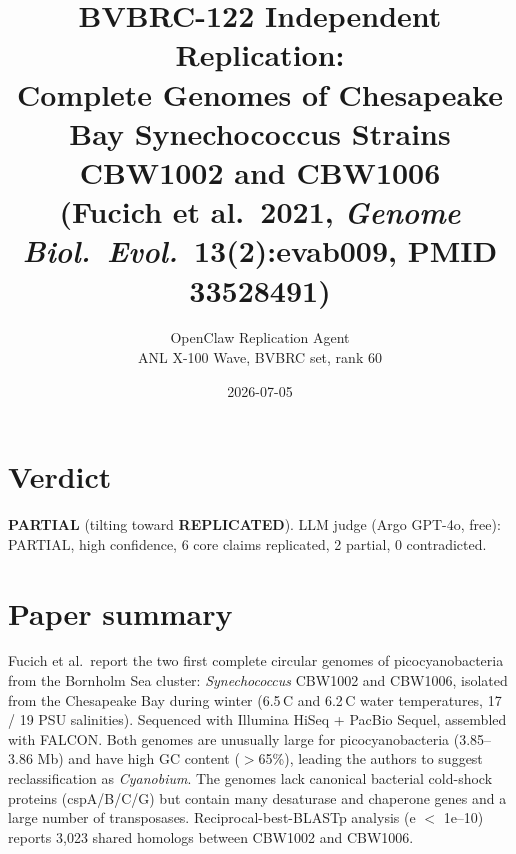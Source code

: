 \documentclass[11pt]{article}
\title{BVBRC-122 Independent Replication:\\
Complete Genomes of Chesapeake Bay Synechococcus Strains CBW1002 and CBW1006\\
{\large (Fucich et al.\ 2021, \emph{Genome Biol.\ Evol.}\ 13(2):evab009, PMID 33528491)}}
\author{OpenClaw Replication Agent \\ ANL X-100 Wave, BVBRC set, rank 60}
\date{2026-07-05}
\begin{document}
\maketitle

\section*{Verdict}
\textbf{PARTIAL} (tilting toward \textbf{REPLICATED}). LLM judge (Argo GPT-4o, free): PARTIAL, high confidence, 6 core claims replicated, 2 partial, 0 contradicted.

\section{Paper summary}
Fucich et al.\ report the two first complete circular genomes of picocyanobacteria from the Bornholm Sea cluster: \emph{Synechococcus} CBW1002 and CBW1006, isolated from the Chesapeake Bay during winter (6.5\,\textdegree{}C and 6.2\,\textdegree{}C water temperatures, 17 / 19 PSU salinities). Sequenced with Illumina HiSeq + PacBio Sequel, assembled with FALCON. Both genomes are unusually large for picocyanobacteria (3.85--3.86 Mb) and have high GC content ($>$65\%), leading the authors to suggest reclassification as \emph{Cyanobium}. The genomes lack canonical bacterial cold-shock proteins (cspA/B/C/G) but contain many desaturase and chaperone genes and a large number of transposases. Reciprocal-best-BLASTp analysis (e $<$ 1e--10) reports 3{,}023 shared homologs between CBW1002 and CBW1006.
\end{document}
